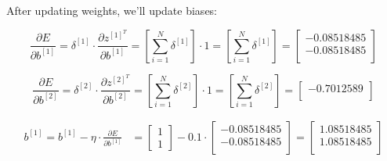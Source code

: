 \documentclass[12pt]{article}
\begin{document}
\begin{enumerate}[leftmargin=\labelsep]
        After updating weights, we'll update biases:

        \begin{equation*}
          \frac{\partial E}{\partial b^{[1]}} = \delta^{[1]} \cdot
          \frac{\partial z^{[1]^T}}{\partial b^{[1]}}
          = \left[\sum_{i=1}^N \delta^{[1]}\right] \cdot 1
          = \left[\sum_{i=1}^N \delta^{[1]}\right]
          = \begin{bmatrix}
            -0.08518485\\
            -0.08518485\\
          \end{bmatrix}
        \end{equation*}

        \begin{equation*}
          \frac{\partial E}{\partial b^{[2]}} = \delta^{[2]} \cdot
          \frac{\partial z^{[2]^T}}{\partial b^{[2]}}
          = \left[\sum_{i=1}^N \delta^{[2]}\right] \cdot 1
          = \left[\sum_{i=1}^N \delta^{[2]}\right]
          = \begin{bmatrix}
            -0.7012589\\
          \end{bmatrix}
        \end{equation*}

        \begin{equation*}
          \begin{aligned}
            b^{[1]} = b^{[1]} - \eta \cdot \frac{\partial E}{\partial b^{[1]}}
             & = \begin{bmatrix}
                   1 \\
                   1
                 \end{bmatrix} - 0.1 \cdot \begin{bmatrix}
                  -0.08518485\\
                  -0.08518485\\
                \end{bmatrix} = \begin{bmatrix}
              1.08518485\\
              1.08518485\\
            \end{bmatrix}
          \end{aligned}
        \end{equation*}


\end{enumerate}
\end{document}
